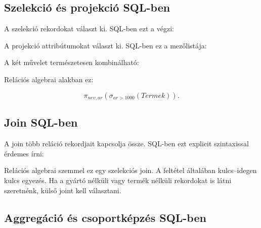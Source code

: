 \begin{center}

\end{center}

\subsection{Szelekció és projekció SQL-ben}

A szelekció rekordokat választ ki. SQL-ben ezt a  végzi:

\begin{center}
\end{center}

A projekció attribútumokat választ ki. SQL-ben ez a  mezőlistája:

\begin{center}
\end{center}

A két művelet természetesen kombinálható:

\begin{center}
\end{center}

Relációs algebrai alakban ez:

\[
  \pi_{nev,ar}(\sigma_{ar>1000}(Termek)).
\]

\subsection{Join SQL-ben}

A join több reláció rekordjait kapcsolja össze. SQL-ben ezt explicit  szintaxissal érdemes írni:

\begin{center}
\end{center}

Relációs algebrai szemmel ez egy szelekciós join. A feltétel általában kulcs--idegen kulcs egyezés. Ha a gyártó nélküli vagy termék nélküli rekordokat is látni szeretnénk, külső joint kell választani.

\subsection{Aggregáció és csoportképzés SQL-ben}


